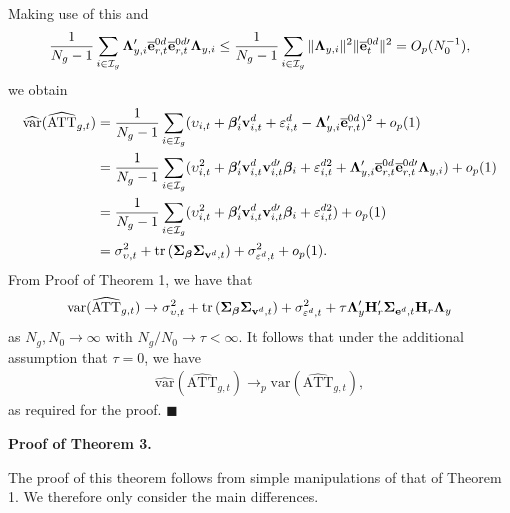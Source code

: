 \documentclass[12pt,fleqn]{article}
\begin{document}
Making use of this and
\begin{align}
\frac{1}{N_g-1} \sum_{i \in \mathcal{I}_g} \boldsymbol{\Lambda}_{y,i}'\overline{\mathbf{e}}_{r,t}^{0d}\overline{\mathbf{e}}_{r,t}^{0d\prime} \boldsymbol{\Lambda}_{y,i} \leq  \frac{1}{N_g-1} \sum_{i \in \mathcal{I}_g}\|\boldsymbol{\Lambda}_{y,i}\|^2 \|\overline{\mathbf{e}}_{t}^{0d}\|^2  = O_p(N_0^{-1}),
\end{align}
we obtain
\begin{align}
\widehat{\mathrm{var}}(\widehat{\mathrm{ATT}}_{g,t}) & = \frac{1}{N_g-1} \sum_{i \in \mathcal{I}_g} (\upsilon_{i,t}  + \boldsymbol{\beta}_i'\mathbf{v}_{i,t}^d + \varepsilon_{i,t}^d - \boldsymbol{\Lambda}_{y,i}'\overline{\mathbf{e}}_{r,t}^{0d})^2 + o_p(1) \notag\\
& = \frac{1}{N_g-1} \sum_{i \in \mathcal{I}_g} (\upsilon_{i,t}^2  + \boldsymbol{\beta}_i'\mathbf{v}_{i,t}^d\mathbf{v}_{i,t}^{d\prime}\boldsymbol{\beta}_i + \varepsilon_{i,t}^{d2}+ \boldsymbol{\Lambda}_{y,i}'\overline{\mathbf{e}}_{r,t}^{0d}\overline{\mathbf{e}}_{r,t}^{0d\prime} \boldsymbol{\Lambda}_{y,i})  + o_p(1) \notag\\
& = \frac{1}{N_g-1} \sum_{i \in \mathcal{I}_g} (\upsilon_{i,t}^2  + \boldsymbol{\beta}_i'\mathbf{v}_{i,t}^d\mathbf{v}_{i,t}^{d\prime}\boldsymbol{\beta}_i + \varepsilon_{i,t}^{d2})  + o_p(1) \notag\\
& = \sigma^2_{\upsilon,t}  + \mathrm{tr}\,(\boldsymbol{\Sigma}_{\boldsymbol{\beta}} \boldsymbol{\Sigma}_{\mathbf{v}^d,t}) + \sigma^2_{\varepsilon^d,t} + o_p(1).
\end{align}
From Proof of Theorem 1, we have that
\begin{align}
\mathrm{var}(\widehat{\mathrm{ATT}}_{g,t}) \to \sigma^2_{\upsilon,t}  + \mathrm{tr}\,(\boldsymbol{\Sigma}_{\boldsymbol{\beta}} \boldsymbol{\Sigma}_{\mathbf{v}^d,t}) + \sigma^2_{\varepsilon^d,t}  + \tau  \boldsymbol{\Lambda}_y' \mathbf{H}_r'  \boldsymbol{\Sigma}_{\mathbf{e}^d,t} \mathbf{H}_r \boldsymbol{\Lambda}_y
\end{align}
as $N_g,N_0\to\infty$ with $N_g/N_0\to\tau < \infty$. It follows that under the additional assumption that $\tau = 0$, we have
\begin{align}
\widehat{\mathrm{var}}(\widehat{\mathrm{ATT}}_{g,t}) \to_p \mathrm{var}(\widehat{\mathrm{ATT}}_{g,t}),
\end{align}
as required for the proof. \hfill{$\blacksquare$}

\bigskip

\noindent\textbf{Proof of Theorem 3.}

\bigskip

\noindent The proof of this theorem follows from simple manipulations of that of Theorem 1. We therefore only consider the main differences.
\end{document}
